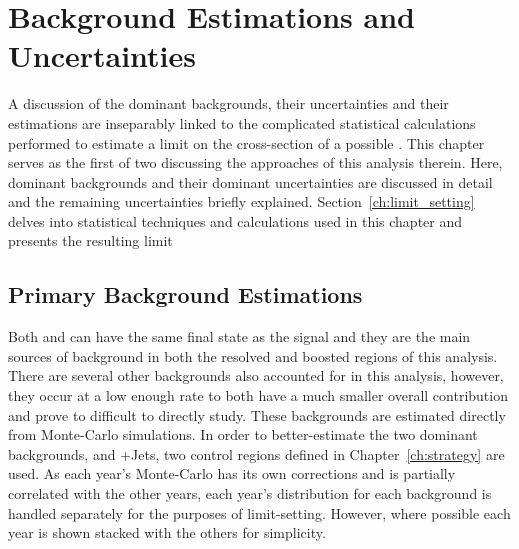 \chapter{Background Estimations and Uncertainties}
\label{ch:bg_estim}
A discussion of the dominant backgrounds, their uncertainties and their estimations are inseparably linked to the complicated statistical calculations performed to estimate a limit on the cross-section of a possible \WR. This chapter serves as the first of two discussing the approaches of this analysis therein. Here, dominant backgrounds and their dominant uncertainties are discussed in detail and the remaining uncertainties briefly explained. Section~\ref{ch:limit_setting} delves into statistical techniques and calculations used in this chapter and presents the resulting limit 

\section{Primary Background Estimations}
Both \ttbar and \Zg can have the same final state as the signal and they are the main sources of background in both the resolved and boosted regions of this analysis. There are several other backgrounds also accounted for in this analysis, however, they occur at a low enough rate to both have a much smaller overall contribution and prove to difficult to directly study. These backgrounds are estimated directly from Monte-Carlo simulations. In order to better-estimate the two dominant backgrounds, \ttbar and \Z+Jets, two control regions defined in Chapter~\ref{ch:strategy} are used. As each year's Monte-Carlo has its own corrections and is partially correlated with the other years, each year's distribution for each background is handled separately for the purposes of limit-setting. However, where possible each year is shown stacked with the others for simplicity.

